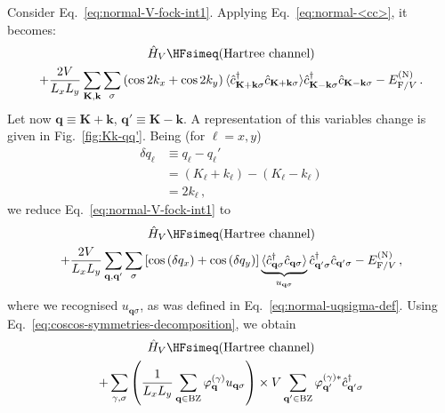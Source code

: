 \begin{tabproof}
	
	Consider Eq.~\eqref{eq:normal-V-fock-int1}. Applying Eq.~\eqref{eq:normal-<cc>}, it becomes:
	\begin{multline}
		\hat H_V \HFsimeq (\text{Hartree channel})\\ + 
		\frac{2V}{L_x L_y} \sum_{\mathbf{K}, \mathbf{k}} \sum_\sigma \left( \cos 2 k_x + \cos 2 k_y	
		\right)
		\langle
		\hat c_{\mathbf{K}+\mathbf{k} \sigma}^\dagger 
		\hat c_{\mathbf{K}+\mathbf{k} \sigma}
		\rangle
		\hat c_{\mathbf{K}-\mathbf{k} \sigma}^\dagger  \hat c_{\mathbf{K}-\mathbf{k}\sigma} - E_{\mathrm{F}/V}^{(\mathrm{N})} \, . \label{eq:normal-V-fock-int2}
	\end{multline}
	Let now $\mathbf{q}\equiv\mathbf{K}+\mathbf{k}$, $\mathbf{q}'\equiv\mathbf{K}-\mathbf{k}$. A representation of this variables change is given in Fig.~\ref{fig:Kk-qq'}. Being (for $\ell=x,y$)
	\[
	\begin{aligned}
		\delta q_\ell &\equiv q_\ell - q_\ell' \\
		&= (K_\ell+k_\ell) - (K_\ell-k_\ell) \\
		&= 2k_\ell \, ,
	\end{aligned}
	\]
	we reduce Eq.~\eqref{eq:normal-V-fock-int1} to
	\begin{multline}
		\hat H_V \HFsimeq (\text{Hartree channel}) \\
		+ \frac{2V}{L_x L_y} \sum_{\mathbf{q}, \mathbf{q}'} \sum_\sigma \left[
			\cos \left(
				\delta q_x
			\right)	+ \cos \left(
				\delta q_y
			\right)	
		\right]	
		\underbrace{\langle
			\hat c_{\mathbf{q}\sigma}^\dagger 
			\hat c_{\mathbf{q}\sigma}
		\rangle}_{u_{\mathbf{q}\sigma}}
		\hat c_{\mathbf{q}'\sigma}^\dagger  \hat c_{\mathbf{q}'\sigma} - E_{\mathrm{F}/V}^{(\mathrm{N})} \, , \label{eq:normal-V-fock-int3}
	\end{multline}
	where we recognised $u_{\mathbf{q}\sigma}$, as was defined in Eq.~\eqref{eq:normal-uqsigma-def}. Using Eq.~\eqref{eq:coscos-symmetries-decomposition}, we obtain
	\begin{multline}
		\hat H_V \HFsimeq (\text{Hartree channel}) \\
		+ \sum_{\gamma,\sigma} \left(
			\frac{1}{L_x L_y} \sum_\mathbf{q\in\mathrm{BZ}} \varphi_\mathbf{q}^{(\gamma)}
			u_{\mathbf{q}\sigma}
		\right) \times V
		\sum_{\mathbf{q}'\in\mathrm{BZ}}
		\varphi_{\mathbf{q}'}^{(\gamma)*}
		\hat c_{\mathbf{q}'\sigma}^\dagger

\end{multline}
\end{tabproof}
